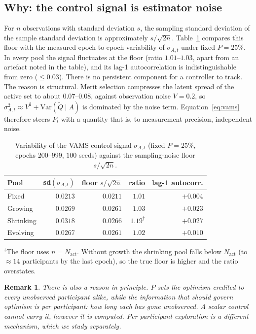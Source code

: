 \documentclass[sigconf,anonymous,review,nonacm]{acmart}
\newtheorem{remark}{Remark}
\begin{document}
\subsection{Why: the control signal is estimator noise}
For $n$ observations with standard deviation $s$, the sampling standard deviation of the
sample standard deviation is approximately $s/\sqrt{2n}$. Table~\ref{tab:noise} compares
this floor with the measured epoch-to-epoch variability of $\sigma_{A,t}$ under fixed
$P=25\%$. In every pool the signal fluctuates at the floor (ratio $1.01$--$1.03$, apart
from an artefact noted in the table), and its lag-1 autocorrelation is indistinguishable
from zero ($\le0.03$). There is no persistent component for a controller to track. The
reason is structural. Merit selection compresses the latent spread of the active set to
about $0.07$--$0.08$, against observation noise $V=0.2$, so $\sigma_{A,t}^2\approx V^2+\mathrm{Var}(\tilde Q\mid A)$ is dominated by
the noise term. Equation~\eqref{eq:vams} therefore steers $P_t$ with a quantity that is,
to measurement precision, independent noise.

\begin{table}[t]\centering\small
\caption{Variability of the VAMS control signal $\sigma_{A,t}$ (fixed $P=25\%$, epochs
200--999, $100$ seeds) against the sampling-noise floor $s/\sqrt{2n}$.}
\label{tab:noise}
\begin{tabular}{lrrrr}
\toprule
Pool & sd$(\sigma_{A,t})$ & floor $s/\sqrt{2n}$ & ratio & lag-1 autocorr.\\
\midrule
Fixed     & $0.0213$ & $0.0211$ & $1.01$ & $+0.004$\\
Growing   & $0.0269$ & $0.0261$ & $1.03$ & $+0.023$\\
Shrinking & $0.0318$ & $0.0266$ & $1.19^{\dagger}$ & $+0.027$\\
Evolving  & $0.0267$ & $0.0261$ & $1.02$ & $+0.010$\\
\bottomrule
\end{tabular}

\smallskip\raggedright\footnotesize $^{\dagger}$The floor uses $n=N_{\mathrm{act}}$. Without
growth the shrinking pool falls below $N_{\mathrm{act}}$ (to ${\approx}14$ participants by
the last epoch), so the true floor is higher and the ratio overstates.
\end{table}

\begin{remark}
There is also a reason in principle. $P$ sets the optimism credited to \emph{every}
unobserved participant alike, while the information that should govern optimism is
per participant: how long each has gone unobserved. A scalar control cannot carry it,
however it is computed. Per-participant exploration is a different mechanism, which we
study separately.
\end{remark}
\end{document}
